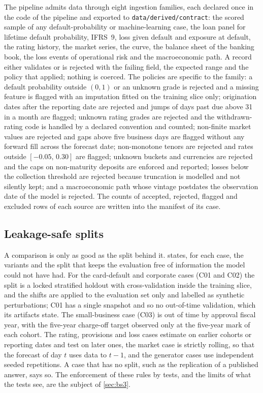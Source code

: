 The pipeline admits data through eight ingestion families, each declared once in the code of the pipeline and exported to \texttt{data/derived/contract}: the scored sample of any default-probability or machine-learning case, the loan panel for lifetime default probability, IFRS~9, loss given default and exposure at default, the rating history, the market series, the curve, the balance sheet of the banking book, the loss events of operational risk and the macroeconomic path. A record either validates or is rejected with the failing field, the expected range and the policy that applied; nothing is coerced. The policies are specific to the family: a default probability outside $(0,1)$ or an unknown grade is rejected and a missing feature is flagged with an imputation fitted on the training slice only; origination dates after the reporting date are rejected and jumps of days past due above 31 in a month are flagged; unknown rating grades are rejected and the withdrawn-rating code is handled by a declared convention and counted; non-finite market values are rejected and gaps above five business days are flagged without any forward fill across the forecast date; non-monotone tenors are rejected and rates outside $[-0.05,\,0.30]$ are flagged; unknown buckets and currencies are rejected and the caps on non-maturity deposits are enforced and reported; losses below the collection threshold are rejected because truncation is modelled and not silently kept; and a macroeconomic path whose vintage postdates the observation date of the model is rejected. The counts of accepted, rejected, flagged and excluded rows of each source are written into the manifest of its case. %

\subsection{Leakage-safe splits}
\label{sec:data-splits}

A comparison is only as good as the split behind it.  states, for each case, the variants and the split that keeps the evaluation free of information the model could not have had.
For the card-default and corporate cases (C01 and C02) the split is a locked stratified holdout with cross-validation inside the training slice, and the shifts are applied to the evaluation set only and labelled as synthetic perturbations; C01 has a single snapshot and so no out-of-time validation, which its artifacts state. The small-business case (C03) is out of time by approval fiscal year, with the five-year charge-off target observed only at the five-year mark of each cohort. The rating, provisions and loss cases estimate on earlier cohorts or reporting dates and test on later ones, the market case is strictly rolling, so that the forecast of day $t$ uses data to $t-1$, and the generator cases use independent seeded repetitions. A case that has no split, such as the replication of a published answer, says so. The enforcement of these rules by tests, and the limits of what the tests see, are the subject of \cref{sec:bs3}.


